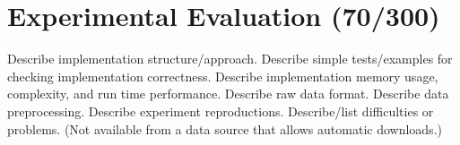 \section{Experimental Evaluation (70/300)}

Describe implementation structure/approach.
Describe simple tests/examples for checking implementation correctness.
Describe implementation memory usage, complexity, and run time performance.
Describe raw data format.
Describe data preprocessing.
Describe experiment reproductions.
Describe/list difficulties or problems. (Not available from a data source that allows automatic downloads.)

